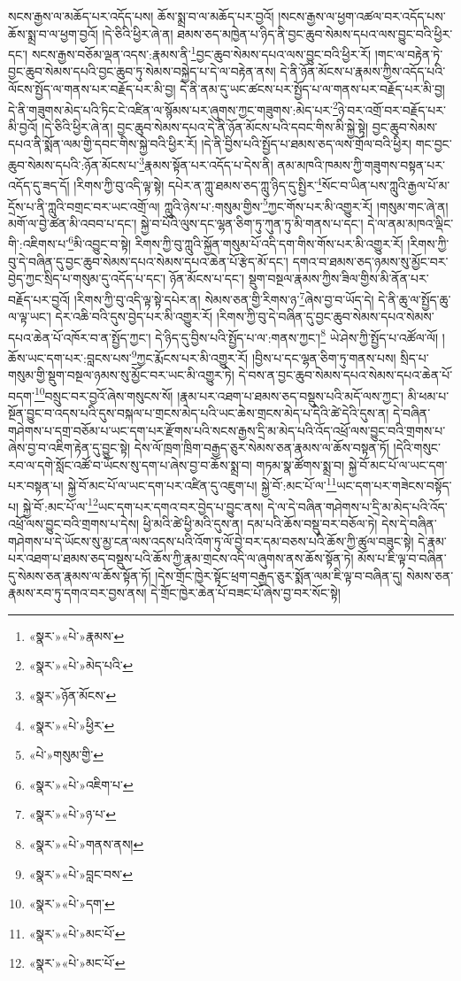 སངས་རྒྱས་ལ་མཆོད་པར་འདོད་པས། ཆོས་སྨྲ་བ་ལ་མཆོད་པར་བྱའོ། །སངས་རྒྱས་ལ་ཕྱག་འཚལ་བར་འདོད་པས་ཆོས་སྨྲ་བ་ལ་ཕྱག་བྱའོ། །དེ་ཅིའི་ཕྱིར་ཞེ་ན། ཐམས་ཅད་མཁྱེན་པ་ཉིད་ནི་བྱང་ཆུབ་སེམས་དཔའ་ལས་བྱུང་བའི་ཕྱིར་དང་། སངས་རྒྱས་བཅོམ་ལྡན་འདས་:རྣམས་ནི་\footnote{«སྣར་»«པེ་»རྣམས་}བྱང་ཆུབ་སེམས་དཔའ་ལས་བྱུང་བའི་ཕྱིར་རོ། །གང་ལ་བརྟེན་ཏེ་བྱང་ཆུབ་སེམས་དཔའི་བྱང་ཆུབ་ཏུ་སེམས་བསྐྱེད་པ་དེ་ལ་བརྟེན་ནས། དེ་ནི་ཉོན་མོངས་པ་རྣམས་ཀྱིས་འདོད་པའི་ལོངས་སྤྱོད་ལ་གནས་པར་བརྗོད་པར་མི་བྱ། དེ་ནི་ནམ་དུ་ཡང་ཚངས་པར་སྤྱོད་པ་ལ་གནས་པར་བརྗོད་པར་མི་བྱ། དེ་ནི་གཟུགས་མེད་པའི་ཏིང་ངེ་འཛིན་ལ་སྙོམས་པར་ཞུགས་ཀྱང་གཟུགས་:མེད་པར་\footnote{«སྣར་»«པེ་»མེད་པའི་}ཉེ་བར་འགྲོ་བར་བརྗོད་པར་མི་བྱའོ། །དེ་ཅིའི་ཕྱིར་ཞེ་ན། བྱང་ཆུབ་སེམས་དཔའ་དེ་ནི་ཉོན་མོངས་པའི་དབང་གིས་མི་སྐྱེ་སྟེ། བྱང་ཆུབ་སེམས་དཔའ་ནི་སྨོན་ལམ་གྱི་དབང་གིས་སྐྱེ་བའི་ཕྱིར་རོ། །དེ་ནི་བྱིས་པའི་སྤྱོད་པ་ཐམས་ཅད་ལས་གྲོལ་བའི་ཕྱིར། གང་བྱང་ཆུབ་སེམས་དཔའི་:ཉོན་མོངས་པ་\footnote{«སྣར་»ཉོན་མོངས་}རྣམས་སྟོན་པར་འདོད་པ་དེས་ནི། ནམ་མཁའི་ཁམས་ཀྱི་གཟུགས་བསྟན་པར་འདོད་དུ་ཟད་དོ། །རིགས་ཀྱི་བུ་འདི་ལྟ་སྟེ། དཔེར་ན་ཀླུ་ཐམས་ཅད་ཀླུ་ཉིད་དུ་སྤྱིར་\footnote{«སྣར་»«པེ་»ཕྱིར་}སོང་བ་ཡིན་པས་ཀླུའི་རྒྱལ་པོ་མ་དྲོས་པ་ནི་ཀླུའི་བགྲང་བར་ཡང་འགྲོ་ལ། ཀླུའི་ཉེས་པ་:གསུམ་གྱིས་\footnote{«པེ་»གསུམ་གྱི་}ཀྱང་གོས་པར་མི་འགྱུར་རོ། །གསུམ་གང་ཞེ་ན། མགོ་ལ་བྱེ་ཚན་མི་འབབ་པ་དང་། སྐྱེ་བ་པོའི་ལུས་དང་ལྷན་ཅིག་ཏུ་ཀུན་ཏུ་མི་གནས་པ་དང་། དེ་ལ་ནམ་མཁའ་ལྡིང་གི་:འཇིགས་པ་\footnote{«སྣར་»«པེ་»འཇིག་པ་}མི་འབྱུང་བ་སྟེ། རིགས་ཀྱི་བུ་ཀླུའི་སྐྱོན་གསུམ་པོ་འདི་དག་གིས་གོས་པར་མི་འགྱུར་རོ། །རིགས་ཀྱི་བུ་དེ་བཞིན་དུ་བྱང་ཆུབ་སེམས་དཔའ་སེམས་དཔའ་ཆེན་པོ་རྩེད་མོ་དང་། དགའ་བ་ཐམས་ཅད་ཉམས་སུ་མྱོང་བར་བྱེད་ཀྱང་སྲིད་པ་གསུམ་དུ་འདོད་པ་དང་། ཉོན་མོངས་པ་དང་། སྡུག་བསྔལ་རྣམས་ཀྱིས་ཟིལ་གྱིས་མི་ནོན་པར་བརྗོད་པར་བྱའོ། །རིགས་ཀྱི་བུ་འདི་ལྟ་སྟེ་དཔེར་ན། སེམས་ཅན་གྱི་རིགས་ཉ་\footnote{«སྣར་»«པེ་»ཉ་པ་}ཞེས་བྱ་བ་ཡོད་དེ། དེ་ནི་ཆུ་ལ་སྤྱོད་ཆུ་ལ་ལྟ་ཡང་། དེར་འཆི་བའི་དུས་བྱེད་པར་མི་འགྱུར་རོ། །རིགས་ཀྱི་བུ་དེ་བཞིན་དུ་བྱང་ཆུབ་སེམས་དཔའ་སེམས་དཔའ་ཆེན་པོ་འཁོར་བ་ན་སྤྱོད་ཀྱང་། དེ་ཉིད་དུ་བྱིས་པའི་སྤྱོད་པ་ལ་:གནས་ཀྱང་།\footnote{«སྣར་»«པེ་»གནས་ནས།} ཡེ་ཤེས་ཀྱི་སྤྱོད་པ་འཚོལ་ལོ། །ཆོས་ཡང་དག་པར་:བླངས་པས་\footnote{«སྣར་»«པེ་»བླང་བས་}ཀྱང་རྨོངས་པར་མི་འགྱུར་རོ། །བྱིས་པ་དང་ལྷན་ཅིག་ཏུ་གནས་པས། སྲིད་པ་གསུམ་གྱི་སྡུག་བསྔལ་ཉམས་སུ་མྱོང་བར་ཡང་མི་འགྱུར་ཏེ། དེ་བས་ན་བྱང་ཆུབ་སེམས་དཔའ་སེམས་དཔའ་ཆེན་པོ་བདག་\footnote{«སྣར་»«པེ་»དག་}བསྲུང་བར་བྱའོ་ཞེས་གསུངས་སོ། །རྣམ་པར་འཐག་པ་ཐམས་ཅད་བསྡུས་པའི་མདོ་ལས་ཀྱང་། མི་ཕམ་པ་སྔོན་བྱུང་བ་འདས་པའི་དུས་བསྐལ་པ་གྲངས་མེད་པའི་ཡང་ཆེས་གྲངས་མེད་པ་དེའི་ཚེ་དེའི་དུས་ན། དེ་བཞིན་གཤེགས་པ་དགྲ་བཅོམ་པ་ཡང་དག་པར་རྫོགས་པའི་སངས་རྒྱས་དྲི་མ་མེད་པའི་འོད་འཕྲོ་ལས་བྱུང་བའི་གྲགས་པ་ཞེས་བྱ་བ་འཇིག་རྟེན་དུ་བྱུང་སྟེ། དེས་ལོ་ཁྲག་ཁྲིག་བརྒྱད་ཅུར་སེམས་ཅན་རྣམས་ལ་ཆོས་བསྟན་ཏོ། །དེའི་གསུང་རབ་ལ་དགེ་སློང་འཚོ་བ་ཡོངས་སུ་དག་པ་ཞེས་བྱ་བ་ཆོས་སྨྲ་བ། གཏམ་སྣ་ཚོགས་སྨྲ་བ། སྐྱེ་བོ་མང་པོ་ལ་ཡང་དག་པར་བསྟན་པ། སྐྱེ་བོ་མང་པོ་ལ་ཡང་དག་པར་འཛིན་དུ་འཇུག་པ། སྐྱེ་བོ་:མང་པོ་ལ་\footnote{«སྣར་»«པེ་»མང་པོ་}ཡང་དག་པར་གཟེངས་བསྟོད་པ། སྐྱེ་བོ་:མང་པོ་ལ་\footnote{«སྣར་»«པེ་»མང་པོ་}ཡང་དག་པར་དགའ་བར་བྱེད་པ་བྱུང་ནས། དེ་ལ་དེ་བཞིན་གཤེགས་པ་དྲི་མ་མེད་པའི་འོད་འཕྲོ་ལས་བྱུང་བའི་གྲགས་པ་དེས། ཕྱི་མའི་ཚེ་ཕྱི་མའི་དུས་ན། དམ་པའི་ཆོས་བསྡུ་བར་བཅོལ་ཏེ། དེས་དེ་བཞིན་གཤེགས་པ་དེ་ཡོངས་སུ་མྱ་ངན་ལས་འདས་པའི་འོག་ཏུ་ལོ་བྱེ་བར་དམ་བཅས་པའི་ཆོས་ཀྱི་ཚུལ་བཟུང་སྟེ། དེ་རྣམ་པར་འཐག་པ་ཐམས་ཅད་བསྡུས་པའི་ཆོས་ཀྱི་རྣམ་གྲངས་འདི་ལ་ཞུགས་ནས་ཆོས་སྟོན་ཏེ། མོས་པ་ཇི་ལྟ་བ་བཞིན་དུ་སེམས་ཅན་རྣམས་ལ་ཆོས་སྟོན་ཏོ། །དེས་གྲོང་ཁྱེར་སྟོང་ཕྲག་བརྒྱད་ཅུར་སྨོན་ལམ་ཇི་ལྟ་བ་བཞིན་དུ། སེམས་ཅན་རྣམས་རབ་ཏུ་དགའ་བར་བྱས་ནས། དེ་གྲོང་ཁྱེར་ཆེན་པོ་བཟང་པོ་ཞེས་བྱ་བར་སོང་སྟེ། 